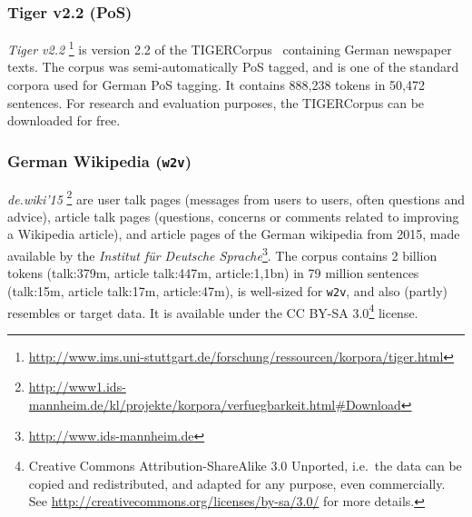 \documentclass[11pt]{article}
\newcommand\wtv{\texttt{w2v}\xspace}
\begin{document}
\subsubsection{Tiger v2.2 (PoS)} %
\emph{Tiger v2.2}%
\footnote{\url{http://www.ims.uni-stuttgart.de/forschung/ressourcen/korpora/tiger.html}}
is version 2.2 of the TIGERCorpus~\cite{Brants2004} containing German newspaper
texts. 
The corpus was semi-automatically PoS tagged, and is one of the standard
corpora used for German PoS tagging. 
It contains 888,238 tokens in 50,472 sentences.
For research and evaluation purposes, the TIGERCorpus can be downloaded for
free.


\subsubsection{German Wikipedia (\wtv)} %
\emph{de.wiki'15}%
\footnote{\url{http://www1.ids-mannheim.de/kl/projekte/korpora/verfuegbarkeit.html\#Download}}
are user talk pages (messages from users to users, often questions and advice),
article talk pages (questions, concerns or comments related to improving a
Wikipedia article), and article pages of the German wikipedia from 2015, made
available by the \emph{Institut f\"{u}r Deutsche
Sprache}\footnote{\url{http://www.ids-mannheim.de}}.
The corpus contains 2 billion tokens 
(talk:379m, article talk:447m, article:1,1bn) 
in 79 million sentences 
(talk:15m, article talk:17m, article:47m), is well-sized for \wtv, and
also (partly) resembles or target data.
It is available under the CC BY-SA 3.0\footnote{Creative Commons
Attribution-ShareAlike 3.0 Unported, i.e.~the data can be copied and
redistributed, and adapted for any purpose, even commercially. See
\url{http://creativecommons.org/licenses/by-sa/3.0/} for more details.}
license.
\end{document}
